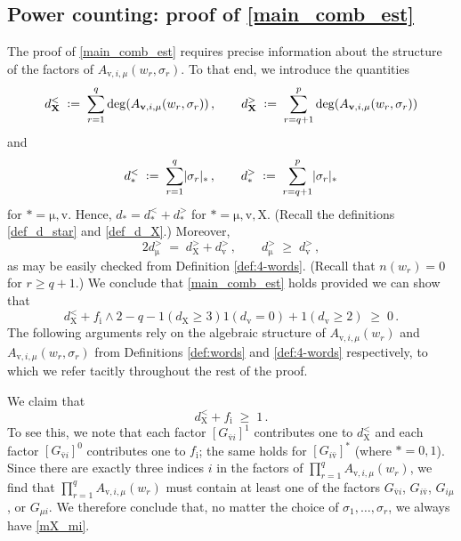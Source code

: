 \documentclass[11pt]{article} %
\numberwithin{equation}{section}
\numberwithin{figure}{section}
\theoremstyle{plain} %
\theoremstyle{definition} %
\newcommand{\f}[1]{\boldsymbol{\mathrm{#1}}} %
\newcommand*{\deq}{\mathrel{\vcenter{\baselineskip0.65ex \lineskiplimit0pt \hbox{.}\hbox{.}}}=}
\renewcommand{\geq}{\geqslant}
\newcommand{\ind}[1]{\f 1 (#1)}
\newcommand{\abs}[1]{\lvert #1 \rvert}
\begin{document}
\subsection{Power counting: proof of \eqref{main_comb_est}} \label{sec:deg_counting}
The proof of \eqref{main_comb_est} requires precise information about the structure of the factors of $A_{\f v,i,\mu}(w_r, \sigma_r)$. To that end, we introduce the quantities
\begin{equation*}
d_{\f X}^< \;\deq\; \sum_{r = 1}^q \deg (A_{\f v,i,\mu}(w_r,\sigma_r)) \,, \qquad d_{\f X}^> \;\deq\; \sum_{r = q+1}^p \deg (A_{\f v,i,\mu}(w_r,\sigma_r))
\end{equation*}
and
\begin{equation*}
d_*^< \;\deq\; \sum_{r = 1}^q \abs{\sigma_r}_* \,, \qquad
d_*^> \;\deq\; \sum_{r = q + 1}^p \abs{\sigma_r}_*
\end{equation*}
for $* = \f \mu, \f v$. Hence, $d_* = d_*^< + d_*^>$ for $* = \f \mu, \f v, \f X$. (Recall the definitions \eqref{def_d_star} and \eqref{def_d_X}.) Moreover,
\begin{equation}
2 d_{\f \mu}^> \;=\; d_{\f X}^> + d_{\f v}^>\,, \qquad d_{\f \mu}^> \;\geq\; d_{\f v}^>\,,
\end{equation}
as may be easily checked from Definition \ref{def:4-words}. (Recall that $n(w_r) = 0$ for $r \geq q + 1$.) We conclude that \eqref{main_comb_est} holds provided we can show that
\begin{equation} \label{main_comb_est_2}
d_{\f X}^< + f_{\f i} \wedge 2 - q
- \ind{d_{\f X} \geq 3} \ind{d_{\f v} = 0} + \ind{d_{\f v} \geq 2} \;\geq\; 0\,.
\end{equation}
The following arguments rely on the algebraic structure of $A_{\f v,i,\mu}(w_r)$ and $A_{\f v,i,\mu}(w_r, \sigma_r)$ from Definitions \ref{def:words} and \ref{def:4-words} respectively, to which we refer tacitly throughout the rest of the proof.

We claim that
\begin{equation} \label{mX_mi}
d_{\f X}^< + f_{\f i} \;\geq\; 1\,.
\end{equation}
To see this, we note that each factor $[G_{\bar {\f v} i}]^1$ contributes one to $d_{\f X}^<$ and each factor $[G_{\bar {\f v} i}]^0$ contributes one to $f_{\f i}$; the same holds for $[G_{i \bar {\f v}}]^*$ (where $* = 0,1$). Since there are exactly three indices $i$ in the factors of $\prod_{r = 1}^q A_{\f v,i,\mu}(w_r)$, we find that $\prod_{r = 1}^q A_{\f v,i,\mu}(w_r)$ must contain at least one of the factors $G_{\bar {\f v} i}$, $G_{i\bar {\f v}}$, $G_{i \mu}$, or $G_{\mu i}$. We therefore conclude that, no matter the choice of $\sigma_1, \dots, \sigma_r$, we always have \eqref{mX_mi}.
\end{document}
